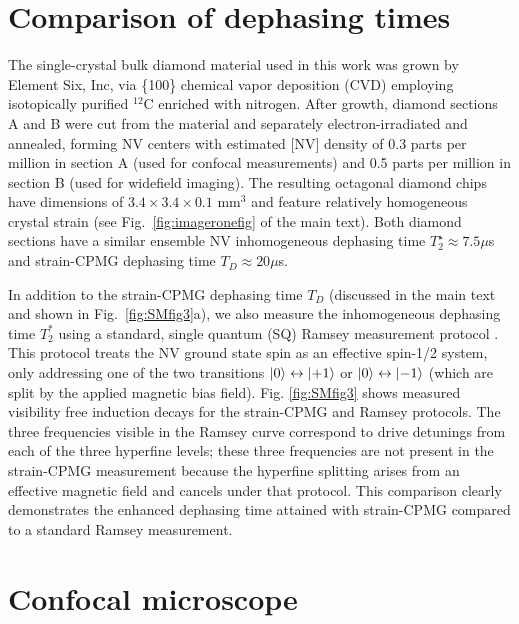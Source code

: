 \documentclass[reprint,superscriptaddress,hyphens,amsmath,amssymb,aps,prx,float]{revtex4-2}
\begin{document}
\smsix

\section{Comparison of dephasing times}
\label{sec:dephasingtimes}

The single-crystal bulk diamond material used in this work was grown by Element Six, Inc, via \{100\} chemical vapor deposition (CVD) employing isotopically purified $^{12}$C enriched with nitrogen. After growth, diamond sections A and B were cut from the material and separately electron-irradiated and annealed, forming NV centers with estimated [NV] density of 0.3 parts per million in section A (used for confocal measurements) and 0.5 parts per million in section B (used for widefield imaging).  The resulting octagonal diamond chips have dimensions of $3.4\times3.4\times0.1$ mm$^3$ and feature relatively homogeneous crystal strain (see Fig.~\ref{fig:imageronefig} of the main text).  Both diamond sections have a similar ensemble NV inhomogeneous dephasing time $T_2^\star\approx7.5\mu$s and strain-CPMG dephasing time $T_D\approx20\mu$s.

In addition to the strain-CPMG dephasing time $T_D$ (discussed in the main text and shown in Fig.~\ref{fig:SMfig3}a), we also measure the inhomogeneous dephasing time $T_2^*$ using a standard, single quantum (SQ) Ramsey measurement protocol \cite{SensitivityReport}. This protocol treats the NV ground state spin as an effective spin-1/2 system, only addressing one of the two transitions $\ket{0} \leftrightarrow \ket{+1}$ or $\ket{0} \leftrightarrow \ket{-1}$ (which are split by the applied magnetic bias field). Fig. \ref{fig:SMfig3} shows measured visibility free induction decays for the strain-CPMG and Ramsey protocols. The three frequencies visible in the Ramsey curve correspond to drive detunings from each of the three hyperfine levels; these three frequencies are not present in the strain-CPMG measurement because the hyperfine splitting arises from an effective magnetic field and cancels under that protocol. This comparison clearly demonstrates the enhanced dephasing time attained with strain-CPMG compared to a standard Ramsey measurement.

\smseven

\section{Confocal microscope}
\label{sec:confocalapparatus}
\end{document}
